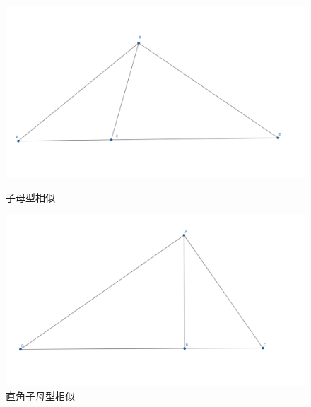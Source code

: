 \begin{figure}[h]
    \centering
    \hfill %
    \begin{minipage}[t]{0.45\textwidth}
    \centering
    \includegraphics[width=0.8\linewidth]{figures/子母型相似.png}
    \caption{子母型相似}
    \end{minipage}
    \hfill %
    \begin{minipage}[t]{0.45\textwidth}
    \centering
    \includegraphics[width=0.8\linewidth]{figures/射影定理.png}
    \caption{直角子母型相似}
    \end{minipage}
\end{figure}




